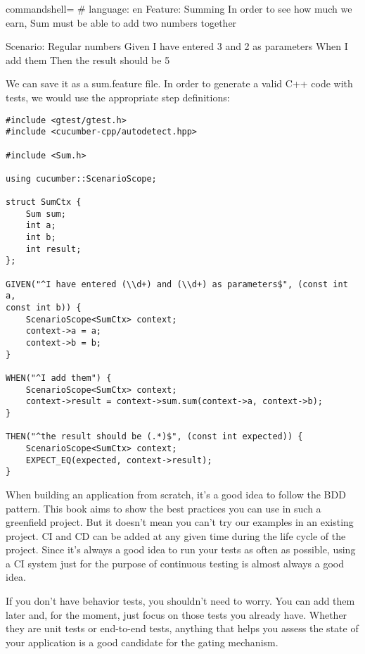 \begin{tcblisting}{commandshell={}}
# language: en
Feature: Summing
In order to see how much we earn,
Sum must be able to add two numbers together

Scenario: Regular numbers
  Given I have entered 3 and 2 as parameters
  When I add them
  Then the result should be 5
\end{tcblisting}

We can save it as a sum.feature file. In order to generate a valid C++ code with tests, we would use the appropriate step definitions:

\begin{lstlisting}[style=styleCXX]
#include <gtest/gtest.h>
#include <cucumber-cpp/autodetect.hpp>

#include <Sum.h>

using cucumber::ScenarioScope;

struct SumCtx {
	Sum sum;
	int a;
	int b;
	int result;
};

GIVEN("^I have entered (\\d+) and (\\d+) as parameters$", (const int a,
const int b)) {
	ScenarioScope<SumCtx> context;
	context->a = a;
	context->b = b;
}

WHEN("^I add them") {
	ScenarioScope<SumCtx> context;
	context->result = context->sum.sum(context->a, context->b);
}

THEN("^the result should be (.*)$", (const int expected)) {
	ScenarioScope<SumCtx> context;
	EXPECT_EQ(expected, context->result);
}
\end{lstlisting}

When building an application from scratch, it's a good idea to follow the BDD pattern. This book aims to show the best practices you can use in such a greenfield project. But it doesn't mean you can't try our examples in an existing project. CI and CD can be added at any given time during the life cycle of the project. Since it's always a good idea to run your tests as often as possible, using a CI system just for the purpose of continuous testing is almost always a good idea.

If you don't have behavior tests, you shouldn't need to worry. You can add them later and, for the moment, just focus on those tests you already have. Whether they are unit tests or end-to-end tests, anything that helps you assess the state of your application is a good candidate for the gating mechanism.



